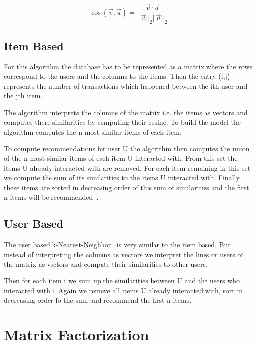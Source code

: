 \begin{equation}
\cos(\overrightarrow{v}, \overrightarrow{u})=\frac{\overrightarrow{v} \cdot \overrightarrow{u}}{||\overrightarrow{v}||_{2} ||\overrightarrow{u}||_{2}}
\end{equation}



\subsection{Item Based}
\label{itembasedknn}

For this algorithm the database has to be represented as a matrix
where the rows correspond to the users and the columns to the items.
Then the entry (i,j) represents the number of transactions which happened
between the ith user and the jth item. 

The algorithm interprets the columns of the matrix i.e. the items
as vectors and computes there similarities by computing their cosine.
To build the model the algorithm computes the n most similar items
of each item. 

To compute recommendations for user U the algorithm then computes
the union of the n most similar items of each item U interacted with.
From this set the items U already interacted with are removed. For
each item remaining in this set we compute the sum of its similarities
to the items U interacted with. Finally these items are sorted in
decreasing order of this sum of similarities and the first n items
will be recommended~\cite{Karypis:2001:EIT:502585.502627}.


\subsection{User Based}

The user based k-Nearest-Neighbor~\cite{userbasedknn} is very similar to the item based.
But instead of interpreting the columns as vectors we interpret the
lines or users of the matrix as vectors and compute their similarities
to other users.

Then for each item i we sum up the similarities between U and the
users who interacted with i. Again we remove all items U already interacted
with, sort in decreasing order fo the sum and recommend the first
n items.


\section{Matrix Factorization}

